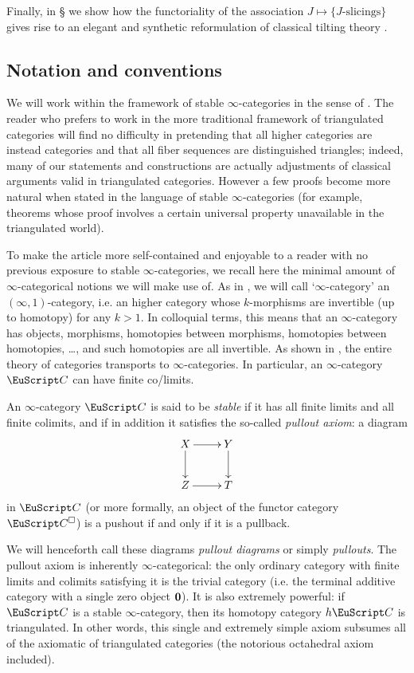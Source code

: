 Finally, in § we show how the functoriality of the association $J\mapsto \{\text{$J$-slicings}\}$ gives rise to an elegant and synthetic reformulation of classical tilting theory \cite{happel}.
{\color{green!40!black}
\subsection{Notation and conventions}
We will work within the framework of stable $\infty$-categories in the sense of \cite{LurieHA}. The reader who prefers to work in the more traditional framework of triangulated categories will find no difficulty in pretending that all higher categories are instead categories and that all fiber sequences are distinguished triangles; indeed, many of our statements and constructions are actually adjustments of classical arguments valid in triangulated categories. However a few proofs become more natural when stated in the language of stable $\infty$-categories (for example, theorems whose proof involves a certain universal property unavailable in the triangulated world).

To make the article more self\hyp{}contained and enjoyable to a reader with no previous exposure to stable $\infty$-categories, we recall here the minimal amount of $\infty$-categorical notions we will make use of. As in \cite{HTT}, we will call `$\infty$-category' an $(\infty,1)$-category, i.e. an higher category whose $k$-morphisms are invertible (up to homotopy) for any $k>1$. In colloquial terms, this means that an $\infty$-category has objects, morphisms, homotopies between morphisms, homotopies between homotopies, \dots, and such homotopies are all invertible. As shown in \cite{HTT, Joyal2008}, the entire theory of categories transports to $\infty$-categories. In particular, an $\infty$-category $\C$ can have finite co/limits.
\begin{definition*}
An $\infty$-category $\C$ is said to be \emph{stable}  if it has all finite limits and all finite colimits, and if in addition it satisfies the so-called \emph{pullout axiom}: a diagram
\[
\xymatrix{X\ar[r]\ar[d]&Y\ar[d]\\
Z\ar[r]&T
}
\]
in $\C$ (or more formally, an object of the functor category $\C^\square$) is a pushout if and only if it is a pullback. 
\end{definition*}
We will henceforth call these diagrams \emph{pullout diagrams} or simply \emph{pullouts}.
The pullout axiom is inherently $\infty$-categorical: the only ordinary category with finite limits and colimits satisfying it is the trivial category (i.e. the terminal additive category with a single zero object $\bf 0$). It is also extremely powerful: if $\C$ is a stable $\infty$-category, then its homotopy category $h\C$ is triangulated. In other words, this single and extremely simple axiom subsumes all of the axiomatic of triangulated categories (the notorious octahedral axiom included). 

}
